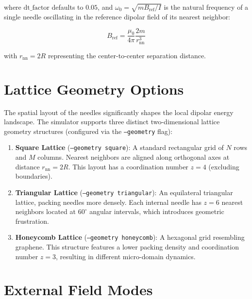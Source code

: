 \documentclass[11pt,a4paper]{article}
\newcommand{\code}[1]{\texttt{#1}}
\begin{document}
\noindent
where $\text{dt\_factor}$ defaults to $0.05$, and $\omega_0 = \sqrt{m B_{\text{ref}}/I}$ is the natural frequency of a single needle oscillating in the reference dipolar field of its nearest neighbor:

\begin{equation}
B_{\text{ref}} = \frac{\mu_0}{4\pi}\frac{2m}{r_{\mathrm{nn}}^3}
\end{equation}

\noindent
with $r_{\mathrm{nn}} = 2R$ representing the center-to-center separation distance.

\section{Lattice Geometry Options}
\label{sec:geometries}

The spatial layout of the needles significantly shapes the local dipolar energy landscape. The simulator supports three distinct two-dimensional lattice geometry structures (configured via the \code{--geometry} flag):

\begin{enumerate}
    \item \textbf{Square Lattice} (\code{--geometry square}): A standard rectangular grid of $N$ rows and $M$ columns. Nearest neighbors are aligned along orthogonal axes at distance $r_{\mathrm{nn}} = 2R$. This layout has a coordination number $z=4$ (excluding boundaries).
    \item \textbf{Triangular Lattice} (\code{--geometry triangular}): An equilateral triangular lattice, packing needles more densely. Each internal needle has $z=6$ nearest neighbors located at $60^{\circ}$ angular intervals, which introduces geometric frustration.
    \item \textbf{Honeycomb Lattice} (\code{--geometry honeycomb}): A hexagonal grid resembling graphene. This structure features a lower packing density and coordination number $z=3$, resulting in different micro-domain dynamics.
\end{enumerate}

\section{External Field Modes}
\label{sec:modes}
\end{document}
